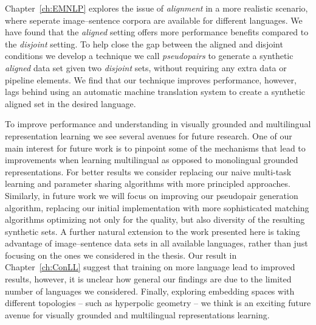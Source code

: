 Chapter~\ref{ch:EMNLP} explores the issue of \emph{alignment} in a more realistic scenario, where
seperate image--sentence corpora are available for different languages. 
We have found that the \emph{aligned}
setting offers more performance benefits compared to the \emph{disjoint} setting. 
To help close the gap between the aligned and disjoint conditions we develop a technique we call \emph{pseudopairs} 
to generate a synthetic \emph{aligned} data set given two \emph{disjoint} sets, without requiring any extra
data or pipeline elements. We find that our technique improves performance, however, lags behind using
an automatic machine translation system to create a synthetic aligned set in the desired language.

To improve performance and understanding in visually grounded and multilingual 
representation learning we see several avenues for future research. 
One of our main interest for future work is to pinpoint some of the mechanisms that lead to 
improvements when learning multilingual as opposed to monolingual grounded representations. 
For better results we consider replacing our naive multi-task learning and parameter sharing algorithms with 
more principled approaches. Similarly, in future work we will focus on improving our pseudopair generation 
algorithm, replacing our initial implementation with more sophisticated matching algorithms optimizing not
only for the quality, but also diversity of the resulting synthetic sets.
A further natural extension to the work presented here is taking advantage 
of image--sentence data sets in all available languages, rather than just focusing on the ones we considered 
in the thesis. Our result in Chapter~\ref{ch:ConLL} suggest that training on more language lead to improved results,
however, it is unclear how general our findings are due to the limited number of languages we considered.
Finally, exploring embedding spaces with different topologies -- such as hyperpolic geometry -- we think is an exciting
future avenue for visually grounded and multilingual representations learning.







